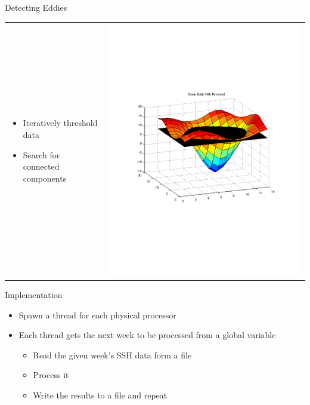 \documentclass[mathserif]{beamer}
\begin{document}
\begin{frame}{Detecting Eddies}
\begin{tabular}[c]{p{}p{}}
 \begin{itemize}
 \item Iteratively threshold data
 \item Search for connected components
 \end{itemize}
 &
 \vspace{2pt}%
 \includegraphics[scale=.35]{figures/eddyWithThreshold.pdf}
 \end{tabular}
\end{frame}

\begin{frame}{Implementation}
\begin{itemize}
\item Spawn a thread for each physical processor
\item Each thread gets the next week to be processed from a global variable
\begin{itemize}
\item Read the given week's SSH data form a file
\item Process it
\item Write the results to a file and repeat
\end{itemize}

\end{itemize}
\end{frame}
\end{document}
